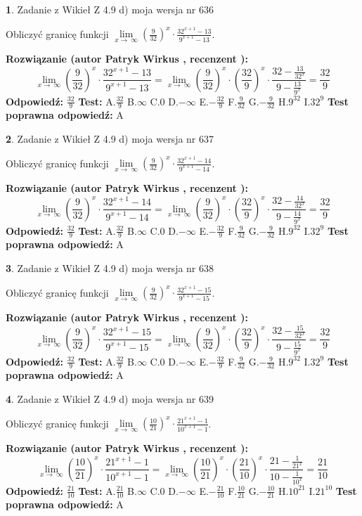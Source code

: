 \documentclass[12pt, a4paper]{article}
\theoremstyle{definition} %
\newtheorem{zad}{}
\newcommand{\zadStart}[1]{\begin{zad}#1\newline}
\newcommand{\zadStop}{\end{zad}}
\newcommand{\rozwStart}[2]{\noindent \textbf{Rozwiązanie (autor #1 , recenzent #2): }\newline}
\newcommand{\rozwStop}{\newline}
\newcommand{\odpStart}{\noindent \textbf{Odpowiedź:}\newline}
\newcommand{\odpStop}{\newline}
\newcommand{\testStart}{\noindent \textbf{Test:}\newline}
\newcommand{\testStop}{\newline}
\newcommand{\kluczStart}{\noindent \textbf{Test poprawna odpowiedź:}\newline}
\newcommand{\kluczStop}{\newline}
\begin{document}
\zadStart{Zadanie z Wikieł Z 4.9 d) moja wersja nr 636}


Obliczyć granicę funkcji  $\lim\limits_{x\to\ \infty}(\frac{9}{32})^{x}\cdot\frac{32^{x+1}-13}{9^{x+1}-13}$.
\zadStop
\rozwStart{Patryk Wirkus}{}
$$\lim\limits_{x\to\ \infty}(\frac{9}{32})^{x}\cdot\frac{32^{x+1}-13}{9^{x+1}-13}=\lim\limits_{x\to\ \infty}(\frac{9}{32})^{x}\cdot(\frac{32}{9})^{x} \cdot \frac{32-\frac{13}{32^{x}}}{9-\frac{13}{9^{x}}} = \frac{32}{9}$$
\rozwStop
\odpStart
$\frac{32}{9}$
\odpStop
\testStart
A.$\frac{32}{9}$ B.$\infty$ C.$0$ D.$-\infty$ E.$-\frac{32}{9}$
F.$\frac{9}{32}$ G.$-\frac{9}{32}$
H.$9^{32}$
I.$32^{9}$
\testStop
\kluczStart
A
\kluczStop



\zadStart{Zadanie z Wikieł Z 4.9 d) moja wersja nr 637}


Obliczyć granicę funkcji  $\lim\limits_{x\to\ \infty}(\frac{9}{32})^{x}\cdot\frac{32^{x+1}-14}{9^{x+1}-14}$.
\zadStop
\rozwStart{Patryk Wirkus}{}
$$\lim\limits_{x\to\ \infty}(\frac{9}{32})^{x}\cdot\frac{32^{x+1}-14}{9^{x+1}-14}=\lim\limits_{x\to\ \infty}(\frac{9}{32})^{x}\cdot(\frac{32}{9})^{x} \cdot \frac{32-\frac{14}{32^{x}}}{9-\frac{14}{9^{x}}} = \frac{32}{9}$$
\rozwStop
\odpStart
$\frac{32}{9}$
\odpStop
\testStart
A.$\frac{32}{9}$ B.$\infty$ C.$0$ D.$-\infty$ E.$-\frac{32}{9}$
F.$\frac{9}{32}$ G.$-\frac{9}{32}$
H.$9^{32}$
I.$32^{9}$
\testStop
\kluczStart
A
\kluczStop



\zadStart{Zadanie z Wikieł Z 4.9 d) moja wersja nr 638}


Obliczyć granicę funkcji  $\lim\limits_{x\to\ \infty}(\frac{9}{32})^{x}\cdot\frac{32^{x+1}-15}{9^{x+1}-15}$.
\zadStop
\rozwStart{Patryk Wirkus}{}
$$\lim\limits_{x\to\ \infty}(\frac{9}{32})^{x}\cdot\frac{32^{x+1}-15}{9^{x+1}-15}=\lim\limits_{x\to\ \infty}(\frac{9}{32})^{x}\cdot(\frac{32}{9})^{x} \cdot \frac{32-\frac{15}{32^{x}}}{9-\frac{15}{9^{x}}} = \frac{32}{9}$$
\rozwStop
\odpStart
$\frac{32}{9}$
\odpStop
\testStart
A.$\frac{32}{9}$ B.$\infty$ C.$0$ D.$-\infty$ E.$-\frac{32}{9}$
F.$\frac{9}{32}$ G.$-\frac{9}{32}$
H.$9^{32}$
I.$32^{9}$
\testStop
\kluczStart
A
\kluczStop



\zadStart{Zadanie z Wikieł Z 4.9 d) moja wersja nr 639}


Obliczyć granicę funkcji  $\lim\limits_{x\to\ \infty}(\frac{10}{21})^{x}\cdot\frac{21^{x+1}-1}{10^{x+1}-1}$.
\zadStop
\rozwStart{Patryk Wirkus}{}
$$\lim\limits_{x\to\ \infty}(\frac{10}{21})^{x}\cdot\frac{21^{x+1}-1}{10^{x+1}-1}=\lim\limits_{x\to\ \infty}(\frac{10}{21})^{x}\cdot(\frac{21}{10})^{x} \cdot \frac{21-\frac{1}{21^{x}}}{10-\frac{1}{10^{x}}} = \frac{21}{10}$$
\rozwStop
\odpStart
$\frac{21}{10}$
\odpStop
\testStart
A.$\frac{21}{10}$ B.$\infty$ C.$0$ D.$-\infty$ E.$-\frac{21}{10}$
F.$\frac{10}{21}$ G.$-\frac{10}{21}$
H.$10^{21}$
I.$21^{10}$
\testStop
\kluczStart
A
\kluczStop
\end{document}
